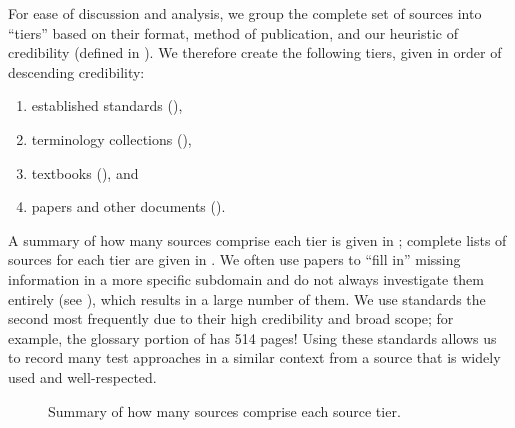 For ease of discussion and analysis, we group the complete set of sources into
``tiers'' based on their format, method of publication, and our heuristic of
credibility (defined in ). We therefore create the
following tiers, given in order of descending credibility:
\begin{enumerate}
    \item established standards (),
    \item terminology collections (),
    \item textbooks (), and
    \item papers and other documents ().
\end{enumerate}
A summary of how many sources comprise each tier is given in
\ifnotpaper; complete lists of sources for each tier
are given in \fi. We often use papers to ``fill in'' missing
information in a more specific subdomain and do not always investigate them
entirely (see ), which results in a large number of them. We
use standards the second most frequently due to their high credibility and
broad scope; for example, the glossary portion of \citep{IEEE2017} has 514
pages! Using these standards allows us to record many test approaches in a
similar context from a source that is widely used and well-respected.

\begin{figure}[bt!]
    \centering
    \caption{Summary of how many sources comprise each source tier.}
    \label{fig:sourceSummary}
\end{figure}

\subsubsection{}
\label{stds}

